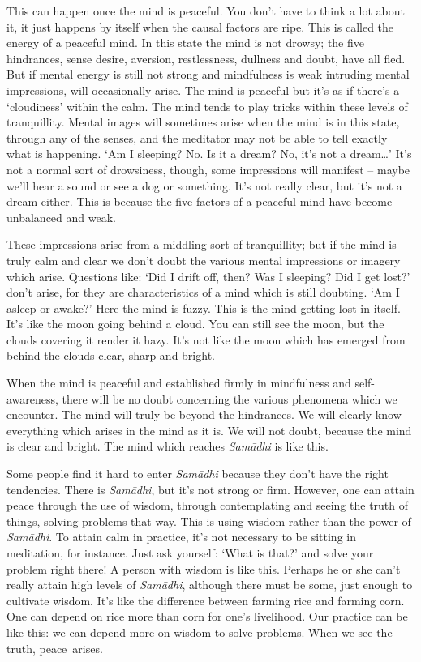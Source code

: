 This can happen once the mind is peaceful. You don't have to think a lot about it, it just happens by itself when the causal factors are ripe. This is called the energy of a peaceful mind. In this state the mind is not drowsy; the five hindrances, sense desire, aversion, restlessness, dullness and doubt, have all fled. But if mental energy is still not strong and mindfulness is weak intruding mental impressions, will occasionally arise. The mind is peaceful but it's as if there's a `cloudiness' within the calm. The mind tends to play tricks within these levels of tranquillity. Mental images will sometimes arise when the mind is in this state, through any of the senses, and the meditator may not be able to tell exactly what is happening. `Am I sleeping? No. Is it a dream? No, it's not a dream\ldots{}' It's not a normal sort of drowsiness, though, some impressions will manifest -- maybe we'll hear a sound or see a dog or something. It's not really clear, but it's not a dream either. This is because the five factors of a peaceful mind have become unbalanced and weak.

These impressions arise from a middling sort of tranquillity; but if the mind is truly calm and clear we don't doubt the various mental impressions or imagery which arise. Questions like: `Did I drift off, then? Was I sleeping? Did I get lost?' don't arise, for they are characteristics of a mind which is still doubting. `Am I asleep or awake?' Here the mind is fuzzy. This is the mind getting lost in itself. It's like the moon going behind a cloud. You can still see the moon, but the clouds covering it render it hazy. It's not like the moon which has emerged from behind the clouds clear, sharp and bright.

When the mind is peaceful and established firmly in mindfulness and self-awareness, there will be no doubt concerning the various phenomena which we encounter. The mind will truly be beyond the hindrances. We will clearly know everything which arises in the mind as it is. We will not doubt, because the mind is clear and bright. The mind which reaches \textit{Sam\=adhi} is like this.

Some people find it hard to enter \textit{Sam\=adhi} because they don't have the right tendencies. There is \textit{Sam\=adhi}, but it's not strong or firm. However, one can attain peace through the use of wisdom, through contemplating and seeing the truth of things, solving problems that way. This is using wisdom rather than the power of \textit{Sam\=adhi}. To attain calm in practice, it's not necessary to be sitting in meditation, for instance. Just ask yourself: `What is that?' and solve your problem right there! A person with wisdom is like this. Perhaps he or she can't really attain high levels of \textit{Sam\=adhi}, although there must be some, just enough to cultivate wisdom. It's like the difference between farming rice and farming corn. One can depend on rice more than corn for one's livelihood. Our practice can be like this: we can depend more on wisdom to solve problems. When we see the truth, peace~arises.

